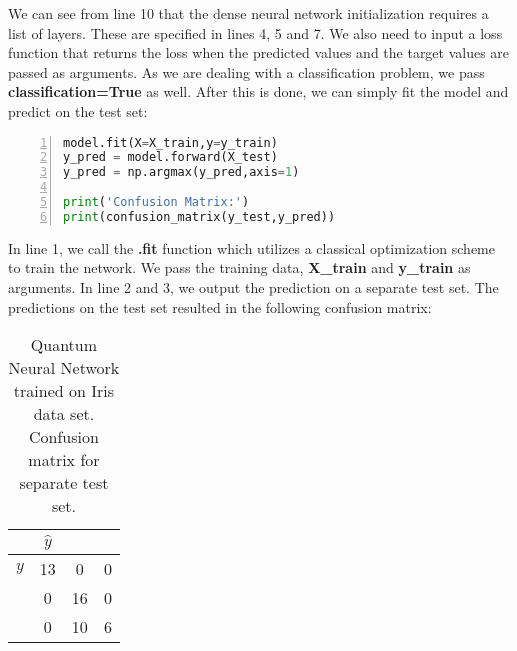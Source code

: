 We can see from line 10 that the dense neural network initialization requires a list of layers. These are specified in lines 4, 5 and 7. We also need to input a loss function that returns the loss when the predicted values and the target values are passed as arguments.
As we are dealing with a classification problem, we pass \textbf{classification=True} as well.
After this is done, we can simply fit the model and predict on the test set:
\begin{lstlisting}[language=Python,numbers=left]
model.fit(X=X_train,y=y_train)
y_pred = model.forward(X_test)
y_pred = np.argmax(y_pred,axis=1)

print('Confusion Matrix:')
print(confusion_matrix(y_test,y_pred))
\end{lstlisting}
In line 1, we call the \textbf{.fit} function which utilizes a classical optimization scheme to train the network. We pass the training data, \textbf{X\_train} and \textbf{y\_train} as arguments. In line 2 and 3, we output the prediction on a separate test set.
The predictions on the test set resulted in the following confusion matrix:
\begin{table}[H]
\centering
\caption{Quantum Neural Network trained on Iris data set. Confusion matrix for separate test set.}
\begin{tabular}{c|c|c|c|}
& $\hat{y}$ &    &     \\ \hline
$y$ & 13        & 0  & 0    \\ \hline
& 0         & 16 & 0    \\ \hline
& 0         & 10 & 6 \\ \hline
\end{tabular}
\label{tab:IrisTestConfMat}
\end{table}


